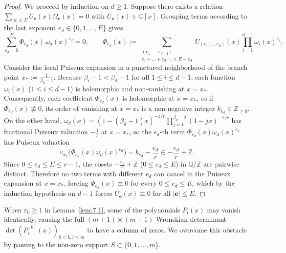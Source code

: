 \documentclass[11pt,reqno]{amsart}
\theoremstyle{remark}
\numberwithin{equation}{section}
\newcommand{\Z}{\mathbb{Z}}
\newcommand{\Q}{\mathbb{Q}}
\newcommand{\C}{\mathbb{C}}
\begin{document}
\begin{proof}
We proceed by induction on $d \ge 1$. Suppose there exists a relation $\sum_{|\mathbf{e}| \le E} U_{\mathbf{e}}(x)\Omega_{\mathbf{e}}(x) = 0$ with $U_{\mathbf{e}}(x) \in \C[x]$. Grouping terms according to the last exponent $e_d \in \{0, 1, \dots, E\}$ gives
\begin{equation}\label{eq:7.9}
\sum_{e_d=0}^E \Phi_{e_d}(x)\,\omega_d(x)^{e_d} = 0, \qquad \Phi_{e_d}(x) := \sum_{\substack{(e_1,\dots,e_{d-1}) \\ e_1 + \dots + e_{d-1} \le E - e_d}} U_{(e_1,\dots,e_d)}(x) \prod_{i=1}^{d-1} \omega_i(x)^{e_i}.
\end{equation}
Consider the local Puiseux expansion in a punctured neighborhood of the branch point $x_* := \frac{1}{\beta_d - 1}$. Because $\beta_i - 1 < \beta_d - 1$ for all $1 \le i \le d - 1$, each function $\omega_i(x)$ ($1 \le i \le d - 1$) is holomorphic and non-vanishing at $x = x_*$. Consequently, each coefficient $\Phi_{e_d}(x)$ is holomorphic at $x = x_*$, so if $\Phi_{e_d}(x) \not\equiv 0$, its order of vanishing at $x = x_*$ is a non-negative integer $k_{e_d} \in \Z_{\ge 0}$. On the other hand, $\omega_d(x) = (1 - (\beta_d - 1)x)^{-1/r} \prod_{j=1}^{\beta_d-2} (1 - jx)^{-1/r}$ has fractional Puiseux valuation $-\frac{1}{r}$ at $x = x_*$, so the $e_d$-th term $\Phi_{e_d}(x)\omega_d(x)^{e_d}$ has Puiseux valuation
\[
v_{x_*}\bigl(\Phi_{e_d}(x)\omega_d(x)^{e_d}\bigr) = k_{e_d} - \frac{e_d}{r} \in -\frac{e_d}{r} + \Z.
\]
Since $0 \le e_d \le E \le r - 1$, the cosets $-\frac{e_d}{r} + \Z$ ($0 \le e_d \le E$) in $\Q/\Z$ are pairwise distinct. Therefore no two terms with different $e_d$ can cancel in the Puiseux expansion at $x = x_*$, forcing $\Phi_{e_d}(x) \equiv 0$ for every $0 \le e_d \le E$, which by the induction hypothesis on $d - 1$ forces $U_{\mathbf{e}}(x) \equiv 0$ for all $|\mathbf{e}| \le E$.
\end{proof}

When $\varepsilon_0 \ge 1$ in Lemma~\ref{lem:7.1}, some of the polynomials $P_i(x)$ may vanish identically, causing the full $(m + 1) \times (m + 1)$ Wronskian determinant $\det(P_i^{[k]}(x))_{0 \le k,i \le m}$ to have a column of zeros. We overcome this obstacle by passing to the non-zero support $S \subset \{0, 1, \dots, m\}$.
\end{document}
